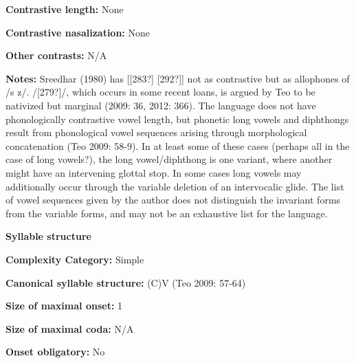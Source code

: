 \begin{styleBody}
\textbf{Contrastive length:} None
\end{styleBody}

\begin{styleBody}
\textbf{Contrastive nasalization:} None
\end{styleBody}

\begin{styleBody}
\textbf{Other contrasts:} N/A
\end{styleBody}

\begin{styleBody}
\textbf{Notes:} Sreedhar (1980) has [[283?] [292?]] not as contrastive but as allophones of /s z/. /[279?]/, which occurs in some recent loans, is argued by Teo to be nativized but marginal (2009: 36, 2012: 366). The language does not have phonologically contrastive vowel length, but phonetic long vowels and diphthongs result from phonological vowel sequences arising through morphological concatenation (Teo 2009: 58-9). In at least some of these cases (perhaps all in the case of long vowels?), the long vowel/diphthong is one variant, where another might have an intervening glottal stop. In some cases long vowels may additionally occur through the variable deletion of an intervocalic glide. The list of vowel sequences given by the author does not distinguish the invariant forms from the variable forms, and may not be an exhaustive list for the language.
\end{styleBody}

\begin{styleBody}
\textbf{Syllable structure}
\end{styleBody}

\begin{styleBody}
\textbf{Complexity Category:} Simple
\end{styleBody}

\begin{styleBody}
\textbf{Canonical syllable structure:} (C)V (Teo 2009: 57-64)
\end{styleBody}

\begin{styleBody}
\textbf{Size of maximal onset:} 1
\end{styleBody}

\begin{styleBody}
\textbf{Size of maximal coda: }N/A
\end{styleBody}

\begin{styleBody}
\textbf{Onset obligatory:} No
\end{styleBody}

